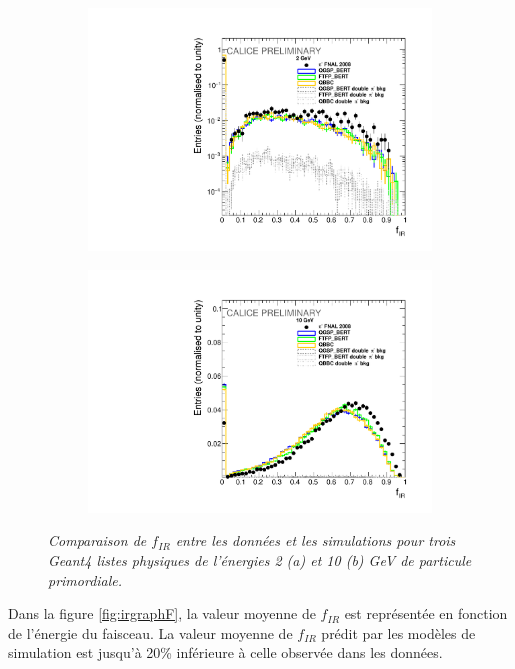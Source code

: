 \begin{figure}
	\centering
	\begin{subfigure}{0.5\textwidth}
		\centering
		\includegraphics[width=.90\linewidth]{ECAL/plots/e-ir-2.pdf}
		\caption{\label{fig:efr2F} }
	\end{subfigure}%
	\begin{subfigure}{0.5\textwidth}
		\centering
		\includegraphics[width=.90\linewidth]{ECAL/plots/e-ir-10.pdf}
		\caption{\label{fig:efr10F} }
	\end{subfigure}
	\caption{\label{fig:irexampleF} \sl%
		Comparaison de $f_{IR}$ entre les données et les simulations pour trois {\sc Geant}4  listes physiques de l'\'energies 2 (a) et 10 (b) GeV de particule primordiale.}
\end{figure}

Dans la figure \ref{fig:irgraphF}, la valeur moyenne de $f_ {IR}$ est représentée en fonction de l'énergie du faisceau.%
La valeur moyenne de $f_{IR}$ prédit par les modèles de simulation est jusqu'à 20\% inférieure à celle observée dans les données.

